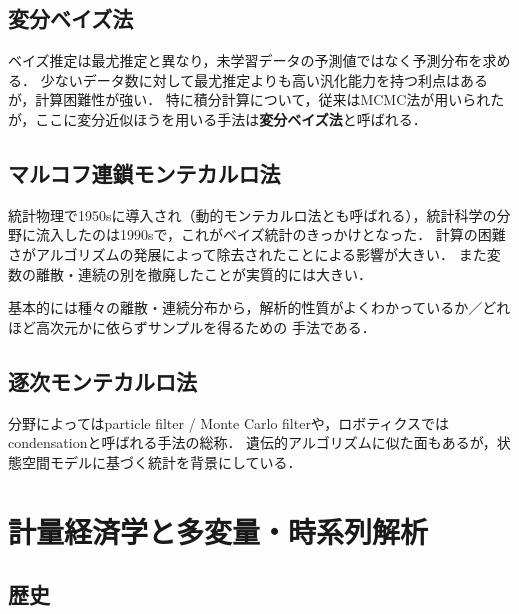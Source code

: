 \documentclass[uplatex,dvipdfmx]{jsreport}
\begin{document}
\section{変分ベイズ法}

\begin{history}
    ベイズ推定は最尤推定と異なり，未学習データの予測値ではなく予測分布を求める．
    少ないデータ数に対して最尤推定よりも高い汎化能力を持つ利点はあるが，計算困難性が強い．
    特に積分計算について，従来はMCMC法が用いられたが，ここに変分近似ほうを用いる手法は\textbf{変分ベイズ法}と呼ばれる．
\end{history}

\section{マルコフ連鎖モンテカルロ法}

\begin{history}
    統計物理で1950sに導入され（動的モンテカルロ法とも呼ばれる），統計科学の分野に流入したのは1990sで，これがベイズ統計のきっかけとなった．
    計算の困難さがアルゴリズムの発展によって除去されたことによる影響が大きい．
    また変数の離散・連続の別を撤廃したことが実質的には大きい．
\end{history}

基本的には種々の離散・連続分布から，解析的性質がよくわかっているか／どれほど高次元かに依らずサンプルを得るための
手法である．

\section{逐次モンテカルロ法}

\begin{history}
    分野によってはparticle filter / Monte Carlo filterや，ロボティクスではcondensationと呼ばれる手法の総称．
    遺伝的アルゴリズムに似た面もあるが，状態空間モデルに基づく統計を背景にしている．
\end{history}

\chapter{計量経済学と多変量・時系列解析}

\section{歴史}
\end{document}
